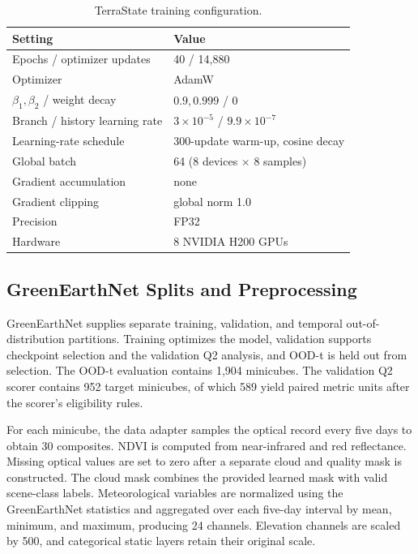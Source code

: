 \documentclass[letterpaper]{article}
\begin{document}
\begin{table}[t]
\centering
{\small
\setlength{\tabcolsep}{3pt}
\begin{tabular}{@{}ll@{}}
\toprule
Setting & Value\\
\midrule
Epochs / optimizer updates & 40 / 14,880\\
Optimizer & AdamW\\
\(\beta_1,\beta_2\) / weight decay & \(0.9,0.999\) / 0\\
Branch / history learning rate & \(3{\times}10^{-5}\) / \(9.9{\times}10^{-7}\)\\
Learning-rate schedule & 300-update warm-up, cosine decay\\
Global batch & 64 (8 devices \(\times\) 8 samples)\\
Gradient accumulation & none\\
Gradient clipping & global norm 1.0\\
Precision & FP32\\
Hardware & 8 NVIDIA H200 GPUs\\
\bottomrule
\end{tabular}
}
\caption{TerraState training configuration.}
\label{tab:training}
\end{table}

\subsection{GreenEarthNet Splits and Preprocessing}

GreenEarthNet supplies separate training, validation, and temporal
out-of-distribution partitions. Training optimizes the model, validation
supports checkpoint selection and the validation Q2 analysis, and OOD-t is
held out from selection. The OOD-t evaluation contains 1,904 minicubes. The
validation Q2 scorer contains 952 target minicubes, of which 589 yield paired
metric units after the scorer's eligibility rules.

For each minicube, the data adapter samples the optical record every five days
to obtain 30 composites. NDVI is computed from near-infrared and red
reflectance. Missing optical values are set to zero after a separate cloud and
quality mask is constructed. The cloud mask combines the provided learned
mask with valid scene-class labels. Meteorological variables are normalized
using the GreenEarthNet statistics and aggregated over each five-day interval
by mean, minimum, and maximum, producing 24 channels. Elevation channels are
scaled by 500, and categorical static layers retain their original scale.
\end{document}
